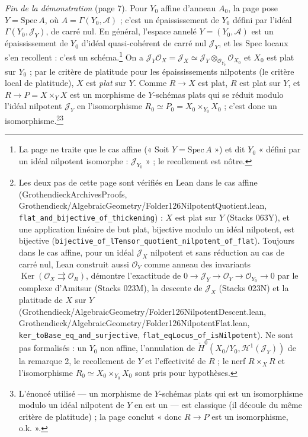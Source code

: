 \documentclass[11pt,a4paper]{article}
\begin{document}
\emph{Fin de la démonstration} (page 7). Pour $Y_0$ affine d'anneau $A_0$, la
page pose $Y = \mathrm{Spec}\,A$, où $A = \Gamma(Y_0, \mathcal{A})$ ; c'est un
épaississement de $Y_0$ défini par l'idéal $\Gamma(Y_0, \mathcal{J}_Y)$, de
carré nul. En général, l'espace annelé $Y = (Y_0, \mathcal{A})$ est un
épaississement de $Y_0$ d'idéal quasi-cohérent de carré nul $\mathcal{J}_Y$,
et les $\mathrm{Spec}$ locaux s'en recollent : c'est un schéma.\footnote{La
page ne traite que le cas affine (« Soit $Y = \mathrm{Spec}\,A$ ») et dit
$Y_0$ « défini par un idéal nilpotent isomorphe : $\mathcal{J}_{Y_0}$ » ; le
recollement est nôtre.} On a $\mathcal{J}_Y \mathcal{O}_X = \mathcal{J}_X \simeq
\mathcal{J}_Y \otimes_{\mathcal{O}_{Y_0}} \mathcal{O}_{X_0}$ et $X_0$ est plat
sur $Y_0$ ; par le critère de platitude pour les épaississements nilpotents
(le critère local de platitude), $X$ est \emph{plat} sur $Y$. Comme $R \to X$
est plat, $R$ est plat sur $Y$, et $R \to P = X \times_Y X$ est un morphisme de
$Y$-schémas plats qui se réduit modulo l'idéal nilpotent $\mathcal{J}_Y$ en
l'isomorphisme $R_0 \simeq P_0 = X_0 \times_{Y_0} X_0$ ; c'est donc un
isomorphisme.\footnote{Les deux pas de cette page sont vérifiés en Lean dans le cas
affine (GrothendieckArchivesProofs, Grothendieck/AlgebraicGeometry/Folder126NilpotentQuotient.lean,
\texttt{flat\_and\_bijective\_of\_thickening}) : $X$ est plat sur $Y$ (Stacks
063Y), et une application linéaire de but plat, bijective modulo un idéal nilpotent,
est bijective (\texttt{bijective\_of\_lTensor\_quotient\_nilpotent\_of\_flat}).
Toujours dans le cas affine, pour un idéal $\mathcal{J}_X$ nilpotent et sans
réduction au cas de carré nul, Lean construit aussi $\mathcal{O}_Y$ comme anneau
des invariants $\operatorname{Ker}(\mathcal{O}_X \rightrightarrows \mathcal{O}_R)$,
démontre l'exactitude de $0 \to \mathcal{J}_Y \to \mathcal{O}_Y \to
\mathcal{O}_{Y_0} \to 0$ par le complexe d'Amitsur (Stacks 023M), la descente de
$\mathcal{J}_X$ (Stacks 023N) et la platitude de $X$ sur $Y$
(Grothendieck/AlgebraicGeometry/Folder126NilpotentDescent.lean, Grothendieck/AlgebraicGeometry/Folder126NilpotentFlat.lean,
\texttt{ker\_toBase\_eq\_and\_surjective}, \texttt{flat\_eqLocus\_of\_isNilpotent}).
Ne sont pas formalisés : un $Y_0$ non affine, l'annulation de
$\check H^0(X_0/Y_0, \mathcal{H}^1(\mathcal{J}_Y))$ de la remarque 2, le
recollement de $Y$ et l'effectivité de $R$ ; le nerf $R \times_X R$ et
l'isomorphisme $R_0 \simeq X_0 \times_{Y_0} X_0$ sont pris pour hypothèses.}\footnote{L'énoncé utilisé — un morphisme de $Y$-schémas plats
qui est un isomorphisme modulo un idéal nilpotent de $Y$ en est un — est
classique (il découle du même critère de platitude) ; la page conclut « donc
$R \to P$ est un isomorphisme, o.k. ».}
\end{document}
